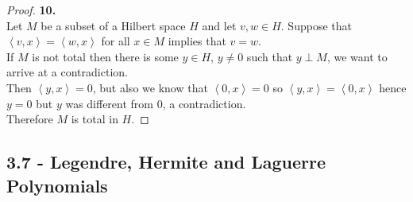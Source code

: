 \documentclass[11pt]{article}
\newcommand{\inprd}[1]{\left\langle{#1}\right\rangle}
\theoremstyle{definition}
\begin{document}
\cleardoublepage
\begin{proof}{\textbf{10.}}\\
Let $M$ be a subset of a Hilbert space $H$ and let $v, w \in H$. Suppose that
$\inprd{v,x} = \inprd{w,x}$ for all $x \in M$ implies that $v = w$.
\\
If $M$ is not total then there is some $y \in H$, $y \neq 0$ such that
$y \perp M$, we want to arrive at a contradiction.
\\
Then $\inprd{y, x} = 0$, but also we know that 
$\inprd{0, x} = 0$ so $\inprd{y, x} = \inprd{0, x}$ hence $y = 0$ but $y$ was
different from 0, a contradiction.
\\ 
Therefore $M$ is total in $H$.
\end{proof}

\cleardoublepage
\subsection*{3.7 - Legendre, Hermite and Laguerre Polynomials}
\end{document}
